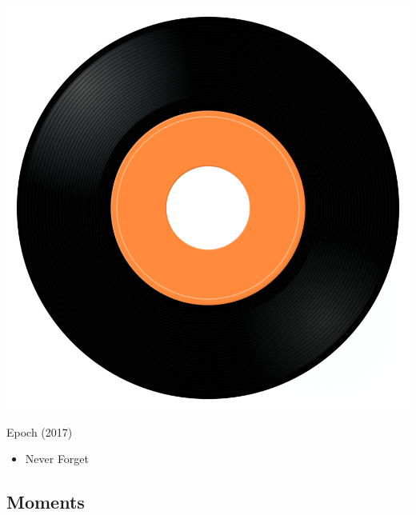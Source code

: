 \begin{minipage}[t]{0.25\textwidth}\vspace{0pt}
\captionsetup{type=figure}
\includegraphics[width=\textwidth]{Images/cover.png}
\caption*{Epoch (2017)}
\end{minipage}
\begin{minipage}[t]{0.25\textwidth}\vspace{0pt}
\begin{itemize}[nosep,leftmargin=1em,labelwidth=*,align=left]
	\setlength{\itemsep}{0pt}
	\item Never Forget
\end{itemize}
\end{minipage}

\subsection{Moments}

